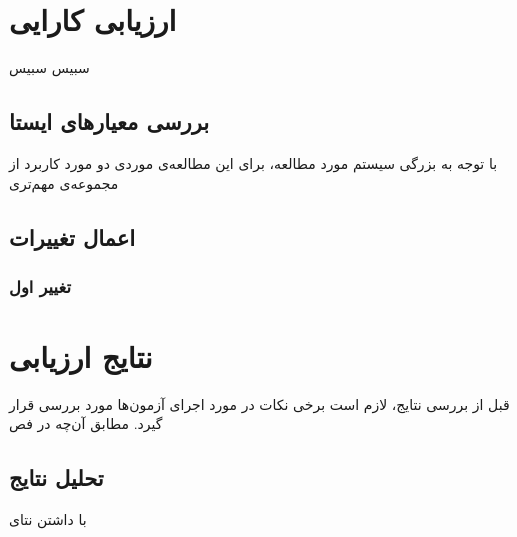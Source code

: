\section{ارزیابی کارایی}
سبیس
سبیس
\subsection{بررسی معیارهای  ایستا }
با توجه به بزرگی سیستم مورد مطالعه، برای این مطالعه‌ی موردی دو مورد کاربرد از مجموعه‌ی مهم‌تری
\subsection{اعمال تغییرات}
\subsubsection{تغییر اول}

\section{نتایج ارزیابی}
قبل از بررسی نتایج، لازم است برخی نکات در مورد اجرای آزمون‌ها مورد بررسی قرار گیرد. مطابق آن‌چه در فص

\subsection{تحلیل نتایج}
با داشتن نتای